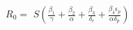 \documentclass[preview]{standalone}
\begin{document}
\begin{center}
$R_0 =$ $S(\frac{\beta_1}{\gamma} + \frac{\beta_2}{\alpha} + \frac{\beta_3}{\delta_c} + \frac{\beta_4 \epsilon_p}{\alpha \delta_p})$
\end{center}
\end{document}

